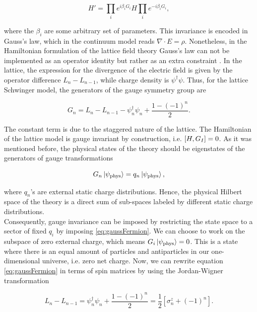\begin{equation}
H' = \prod_i e^{i\beta_i G_i}H\prod_i e^{-i\beta_i G_i},
\end{equation}

where the $\beta_i$ are some arbitrary set of parameters. This invariance is encoded in Gauss's law, which in the continuum model reads $\nabla \cdot E = \rho$. Nonetheless, in the Hamiltonian formulation of the lattice field theory Gauss's law can not be implemented as an operator identity but rather as an extra constraint \cite{Kogut1975}. In the lattice, the expression for the divergence of the electric field is given by the operator difference $L_n-L_{n-1}$, while charge density is $\psi^\dagger\psi$. Thus, for the lattice Schwinger model, the generators of the gauge symmetry group are

\begin{equation}
G_n = L_n - L_{n-1} -\psi_n^\dagger\psi_n + \frac{1-(-1)^n}{2}.
\end{equation}

The constant term is due to the staggered nature of the lattice. The Hamiltonian of the lattice model is gauge invariant by construction, i.e. $\comm{H}{G_I} =0$. As it was mentioned before, the physical states of the theory should be eigenstates of the generators of gauge transformations

\begin{equation}
G_n\ket{\psi_{\text{phys}}} = q_n\ket{\psi_{\text{phys}}}, \label{eq:gaussFermion}
\end{equation}

where $q_n$'s are external static charge distributions.  Hence, the physical Hilbert space of the theory is a direct sum of sub-spaces labeled by different static charge distributions.\\

Consequently, gauge invariance can be imposed by restricting the state space to a sector of fixed $q_i$ by imposing \eqref{eq:gaussFermion}. We can choose to work on the subspace of zero external charge, which means $G_i\ket{\psi_{\text{phys}}} = 0$. This is a state where there is an equal amount of particles and antiparticles in our one-dimensional universe, i.e. zero net charge. Now, we can rewrite equation \eqref{eq:gaussFermion} in terms of spin matrices by using the Jordan-Wigner transformation

\begin{equation}
L_n - L_{n-1}  = \psi_n^\dagger\psi_n + \frac{1-(-1)^n}{2} = \frac{1}{2}[\sigma^z_n + (-1)^n]\label{eq:gaussSpin}.
\end{equation}

